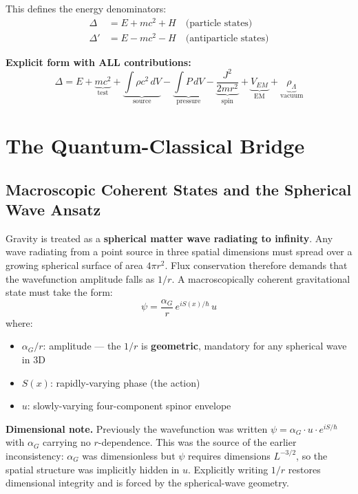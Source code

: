 \documentclass[11pt,a4paper]{article}
\theoremstyle{definition}
\theoremstyle{remark}
\begin{document}
	This defines the energy denominators:
	\begin{align}
		\Delta  &= E + mc^2 + H \quad\text{(particle states)}    \label{eq:Delta}\\
		\Delta' &= E - mc^2 - H \quad\text{(antiparticle states)} \label{eq:Delta_prime}
	\end{align}
	
	\textbf{Explicit form with ALL contributions:}
	\begin{equation}
		\boxed{
			\Delta = E + \underbrace{mc^2}_{\text{test}} + \underbrace{\int\rho c^2\,dV}_{\text{source}} - \underbrace{\int P\,dV}_{\text{pressure}} - \underbrace{\frac{J^2}{2mr^2}}_{\text{spin}} + \underbrace{V_{EM}}_{\text{EM}} + \underbrace{\rho_\Lambda}_{\text{vacuum}}
		}
		\label{eq:Delta_full}
	\end{equation}
	
	\section{The Quantum-Classical Bridge}
	
	\subsection{Macroscopic Coherent States and the Spherical Wave Ansatz}
	
	Gravity is treated as a \textbf{spherical matter wave radiating to infinity}.  Any wave radiating from a point source in three spatial dimensions must spread over a growing spherical surface of area $4\pi r^2$.  Flux conservation therefore demands that the wavefunction amplitude falls as $1/r$.  A macroscopically coherent gravitational state must take the form:
	\begin{equation}
		\psi = \frac{\alpha_G}{r}\,e^{iS(x)/\hbar}\,u
		\label{eq:coherent_state}
	\end{equation}
	where:
	\begin{itemize}
		\item $\alpha_G/r$: amplitude --- the $1/r$ is \textbf{geometric}, mandatory for any spherical wave in 3D
		\item $S(x)$: rapidly-varying phase (the action)
		\item $u$: slowly-varying four-component spinor envelope
	\end{itemize}
	
	\textbf{Dimensional note.}  Previously the wavefunction was written $\psi = \alpha_G \cdot u \cdot e^{iS/\hbar}$ with $\alpha_G$ carrying no $r$-dependence.  This was the source of the earlier inconsistency: $\alpha_G$ was dimensionless but $\psi$ requires dimensions $L^{-3/2}$, so the spatial structure was implicitly hidden in $u$.  Explicitly writing $1/r$ restores dimensional integrity and is forced by the spherical-wave geometry.
	
\end{document}
